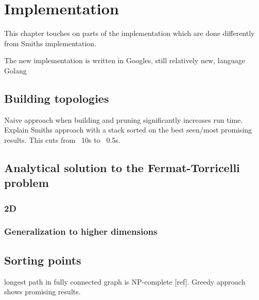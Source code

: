  {
\abnormalparskip{0pt}
\chapter{Implementation}
\label{cha:implementation}
}

This chapter touches on parts of the implementation which are done differently
from Smiths implementation.

The new implementation is written in Googles, still relatively new, language
Golang~\cite{GolangHomepage}

\section{Building topologies}
\label{sec:building-topologies}

Naive approach when building and pruning significantly increases run
time. Explain Smiths approach with a stack sorted on the best seen/most
promising results. This cuts from ~10s to ~0.5s.

\section{Analytical solution to the Fermat-Torricelli problem}
\label{sec:analyt-solut-ferm}

\subsection{2D}
\label{sec:2d}

\subsection{Generalization to higher dimensions}
\label{sec:gener-high-dimens}

\section{Sorting points}
\label{sec:sorting-points}

longest path in fully connected graph is NP-complete [ref]. Greedy approach
shows promising results.

\chapterbreak{}

